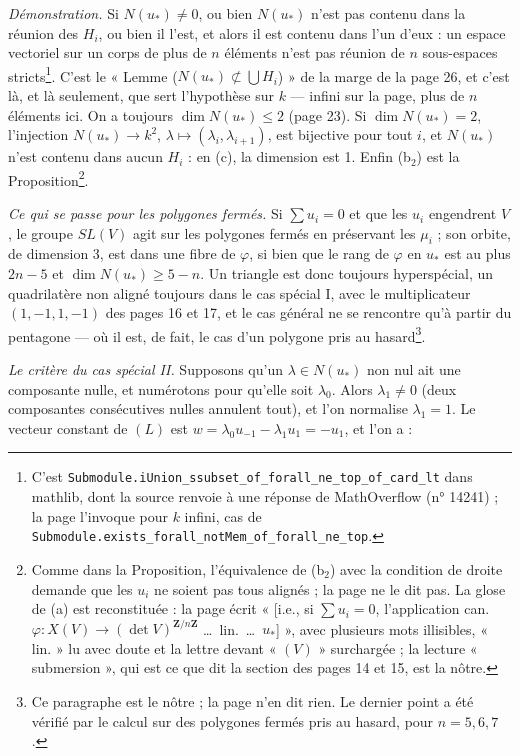 \documentclass[11pt,a4paper]{article}
\begin{document}
\emph{Démonstration.} Si $N(u_*) \neq 0$, ou bien $N(u_*)$ n'est pas contenu
dans la réunion des $H_i$, ou bien il l'est, et alors il est contenu dans l'un
d'eux : un espace vectoriel sur un corps de plus de $n$ éléments n'est pas
réunion de $n$ sous-espaces stricts\footnote{C'est
\texttt{Submodule.iUnion\_ssubset\_of\_forall\_ne\_top\_of\_card\_lt} dans
mathlib, dont la source renvoie à une réponse de MathOverflow (n° 14241) ; la
page l'invoque pour $k$ infini, cas de
\texttt{Submodule.exists\_forall\_notMem\_of\_forall\_ne\_top}.}. C'est le
« Lemme ($N(u_*) \not\subset \bigcup H_i$) » de la marge de la page 26, et
c'est là, et là seulement, que sert l'hypothèse sur $k$ --- infini sur la
page, plus de $n$ éléments ici. On a toujours $\dim N(u_*) \leqslant 2$ (page 23). Si
$\dim N(u_*) = 2$, l'injection $N(u_*) \to k^2$,
$\lambda \mapsto (\lambda_i, \lambda_{i+1})$, est bijective pour tout $i$, et
$N(u_*)$ n'est contenu dans aucun $H_i$ : en (c), la dimension est 1. Enfin
(b$_2$) est la Proposition\footnote{Comme dans la Proposition, l'équivalence de
(b$_2$) avec la condition de droite demande que les $u_i$ ne soient pas tous
alignés ; la page ne le dit pas. La glose de (a) est reconstituée : la page
écrit « [i.e., si $\sum u_i = 0$, l'application can.\
$\varphi : X(V) \to (\det V)^{\mathbf{Z}/n\mathbf{Z}}$ \ldots\ lin.\ \ldots\
$u_*$] », avec plusieurs mots illisibles, « lin. » lu avec doute et la lettre
devant « $(V)$ » surchargée ; la lecture « submersion », qui est ce que dit la
section des pages 14 et 15, est la nôtre.}.

\emph{Ce qui se passe pour les polygones fermés.} Si $\sum u_i = 0$ et que les
$u_i$ engendrent $V$, le groupe $SL(V)$ agit sur les polygones fermés en
préservant les $\mu_i$ ; son orbite, de dimension 3, est dans une fibre de
$\varphi$, si bien que le rang de $\varphi$ en $u_*$ est au plus $2n - 5$ et
$\dim N(u_*) \geqslant 5 - n$. Un triangle est donc toujours hyperspécial, un
quadrilatère non aligné toujours dans le cas spécial I, avec le multiplicateur
$(1, -1, 1, -1)$ des pages 16 et 17, et le cas général ne se rencontre qu'à
partir du pentagone --- où il est, de fait, le cas d'un polygone pris au
hasard\footnote{Ce paragraphe est le nôtre ; la page n'en dit rien. Le
dernier point a été vérifié par le calcul sur des polygones fermés pris au
hasard, pour $n = 5, 6, 7$.}.

\emph{Le critère du cas spécial II.} Supposons qu'un $\lambda \in N(u_*)$ non
nul ait une composante nulle, et numérotons pour qu'elle soit $\lambda_0$.
Alors $\lambda_1 \neq 0$ (deux composantes consécutives nulles annulent tout),
et l'on normalise $\lambda_1 = 1$. Le vecteur constant de $(L)$ est
$w = \lambda_0 u_{-1} - \lambda_1 u_1 = -u_1$, et l'on a :
\end{document}
